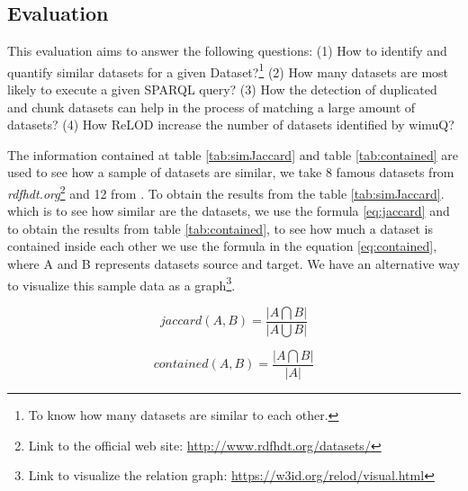 \subsection{Evaluation}
\label{ev:relod}
This evaluation aims to answer the following questions: (1) How to identify and quantify similar datasets for a given Dataset?\footnote{To know how many datasets are similar to each other.} (2) How many datasets are most likely to execute a given SPARQL query? (3) How the detection of duplicated and chunk datasets can help in the process of matching a large amount of datasets? (4) How ReLOD increase the number of datasets identified by wimuQ?

The information contained at table \ref{tab:simJaccard} and table \ref{tab:contained} are used to see how a sample of datasets are similar, we take 8 famous datasets from \textit{rdfhdt.org}\footnote{Link to the official web site: \url{http://www.rdfhdt.org/datasets/}} and 12 from \cite{10.1145/3308560.3317075}. To obtain the results from the table \ref{tab:simJaccard}. which is to see how similar are the datasets, we use the formula \cref{eq:jaccard} and to obtain the results from table \ref{tab:contained}, to see how much a dataset is contained inside each other we use the formula in the equation \ref{eq:contained}, where A and B represents datasets source and target. We have an alternative way to visualize this sample data as a graph\footnote{Link to visualize the relation graph: \url{https://w3id.org/relod/visual.html}}.

\begin{equation} \label{eq:jaccard}
    jaccard(A, B) = \frac{|A \bigcap B|}{ |A\bigcup B|}
\end{equation}

\begin{equation}\label{eq:contained}
    contained(A, B) = \frac{|A \bigcap B|}{|A|}
\end{equation}

